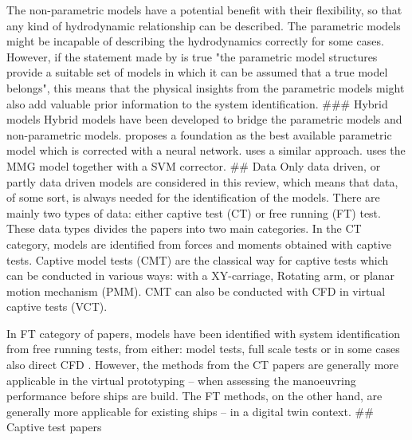 The non-parametric models have a potential benefit with their flexibility, so that any kind of hydrodynamic relationship can be described. The parametric models might be incapable of describing the hydrodynamics correctly for some cases. However, if the statement made by \cite{revestidoherreroTwostepIdentificationNonlinear2012} is true "the parametric model structures provide a suitable set of models in which it can be assumed that a true model belongs", this means that the physical insights from the parametric models might also add valuable prior information to the system identification.
### Hybrid models
Hybrid models have been developed to bridge the parametric models and non-parametric models. \cite{wangIncorporatingApproximateDynamics2021} proposes a foundation as the best available parametric model which is corrected with a neural network. \cite{nielsenMachineLearningEnhancement2022} uses a similar approach. \cite{dongMathdataIntegratedPrediction2023a} uses the MMG model together with a SVM corrector.
## Data
Only data driven, or partly data driven models are considered in this review, which means that data, of some sort, is always needed for the identification of the models. There are mainly two types of data: either captive test (CT) or free running (FT) test. These data types divides the papers into two main categories. In the CT category, models are identified from forces and moments obtained with captive tests. Captive model tests (CMT) are the classical way for captive tests which can be conducted in various ways: with a XY-carriage, Rotating arm, or planar motion mechanism (PMM). CMT can also be conducted with CFD in virtual captive tests (VCT). 

In FT category of papers, models have been identified with system identification from free running tests, from either: model tests, full scale tests or in some cases also direct CFD \cite{arakiEstimatingManeuveringCoefficients2012}.  However, the methods from the CT papers are generally more applicable in the virtual prototyping – when assessing the manoeuvring performance before ships are build. The FT methods, on the other hand, are generally more applicable for existing ships – in a digital twin context.   
## Captive test papers

